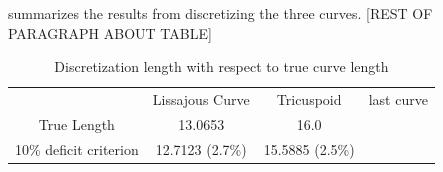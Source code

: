  summarizes the results from discretizing the three curves. [REST OF PARAGRAPH ABOUT TABLE]

\begin{table}[h!] \caption{\label{tab:curvelength} Discretization length with respect to true curve length}
\begin{tabular}{cccc}
 & Lissajous Curve & Tricuspoid & last curve \\
True Length & 13.0653 & 16.0 & \\
10\% deficit criterion & 12.7123 (2.7\%) & 15.5885 (2.5\%) & \\
\end{tabular}
\end{table}
